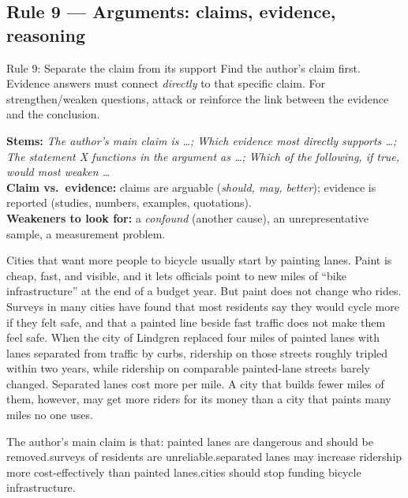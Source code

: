 \documentclass[11pt]{article}
\begin{document}
\subsection{Rule 9 --- Arguments: claims, evidence, reasoning}
\begin{rulebox}{Rule 9: Separate the claim from its support}
Find the author's claim first. Evidence answers must connect \emph{directly} to that specific claim. For strengthen/weaken questions, attack or reinforce the link between the evidence and the conclusion.
\end{rulebox}
\textbf{Stems:} \emph{The author's main claim is \dots; Which evidence most directly supports \dots; The statement X functions in the argument as \dots; Which of the following, if true, would most weaken \dots}\\
\textbf{Claim vs.\ evidence:} claims are arguable (\emph{should, may, better}); evidence is reported (studies, numbers, examples, quotations).\\
\textbf{Weakeners to look for:} a \emph{confound} (another cause), an unrepresentative sample, a measurement problem.

\begin{passage}
Cities that want more people to bicycle usually start by painting lanes. Paint is cheap, fast, and visible, and it lets officials point to new miles of ``bike infrastructure'' at the end of a budget year. But paint does not change who rides. Surveys in many cities have found that most residents say they would cycle more if they felt safe, and that a painted line beside fast traffic does not make them feel safe. When the city of Lindgren replaced four miles of painted lanes with lanes separated from traffic by curbs, ridership on those streets roughly tripled within two years, while ridership on comparable painted-lane streets barely changed. Separated lanes cost more per mile. A city that builds fewer miles of them, however, may get more riders for its money than a city that paints many miles no one uses.
\end{passage}

{The author's main claim is that:}
{painted lanes are dangerous and should be removed.}{surveys of residents are unreliable.}{separated lanes may increase ridership more cost-effectively than painted lanes.}{cities should stop funding bicycle infrastructure.}
\end{document}
